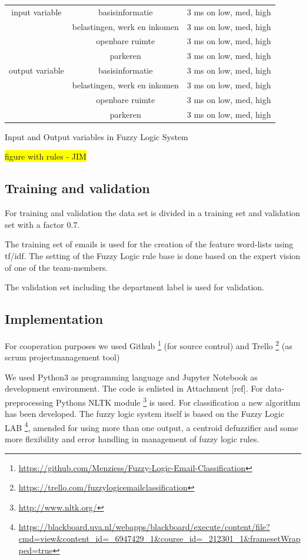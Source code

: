 \documentclass[journal]{IEEEtran}
\begin{document}
\begin{center}
\begin{tabular}{ |c|c|c| }
 \hline
 input variable & basisinformatie   & 3 ms on low, med, high    \\
                & belastingen, werk en inkomen & 3 ms on low, med, high \\
                & openbare ruimte   & 3 ms on low, med, high    \\
                & parkeren          & 3 ms on low, med, high    \\
 output variable& basisinformatie   & 3 ms on low, med, high    \\
                & belastingen, werk en inkomen & 3 ms on low, med, high \\
                & openbare ruimte   & 3 ms on low, med, high    \\
                & parkeren          & 3 ms on low, med, high    \\
\hline
\end{tabular}
\label{table:1}
Input and Output variables in Fuzzy Logic System
\end{center}

\colorbox{yellow}{figure with rules - JIM}

\subsection{Training and validation}

For training and validation the data set is divided in a training set and validation set with a factor 0.7.

The training set of emails is used for the creation of the feature word-lists using tf/idf. The setting of the Fuzzy Logic rule base is done based on the expert vision of one of the team-members. 

The validation set including the department label is used for validation. 

\subsection{Implementation}

For cooperation purposes we used Github \footnote{\url{https://github.com/Menziess/Fuzzy-Logic-Email-Classification}} (for source control) and Trello \footnote{\url{https://trello.com/fuzzylogicemailclassification}} (as scrum projectmanagement tool)

We used Python3 as programming language and Jupyter Notebook as development
environment. The code is enlisted in Attachment [ref]. For data-preprocessing Pythons NLTK module \footnote{\url{http://www.nltk.org/}} is used. For classification a new algorithm has been developed. The fuzzy logic system itself is based on the Fuzzy Logic LAB \footnote{\url{https://blackboard.uva.nl/webapps/blackboard/execute/content/file?cmd=view&content_id=_6947429_1&course_id=_212301_1&framesetWrapped=true}}, amended for using more than one output, a centroid defuzzifier and some more flexibility and error handling in management of fuzzy logic rules.
\end{document}

